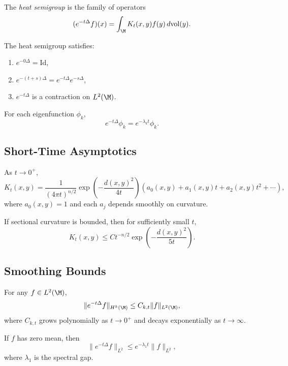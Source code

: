 \begin{definition}
The \emph{heat semigroup} is the family of operators
\[
(e^{-t\Delta} f)(x)
= \int_\M K_t(x,y) f(y)\, d\mathrm{vol}(y).
\]
\end{definition}

\begin{theorem}
The heat semigroup satisfies:
\begin{enumerate}
    \item $e^{-0\Delta} = \mathrm{Id}$,
    \item $e^{-(t+s)\Delta} = e^{-t\Delta} e^{-s\Delta}$,
    \item $e^{-t\Delta}$ is a contraction on $L^2(\M)$.
\end{enumerate}
\end{theorem}

\begin{lemma}
For each eigenfunction $\phi_k$,
\[
e^{-t\Delta} \phi_k = e^{-\lambda_k t} \phi_k.
\]
\end{lemma}

\subsection{Short-Time Asymptotics}

\begin{theorem}
As $t \to 0^+$,
\[
K_t(x,y)
= \frac{1}{(4\pi t)^{n/2}}
\exp\!\left( -\frac{d(x,y)^2}{4t} \right)
\left( a_0(x,y) + a_1(x,y)t + a_2(x,y)t^2 + \cdots \right),
\]
where $a_0(x,y) = 1$ and each $a_j$ depends smoothly on curvature.
\end{theorem}

\begin{lemma}
If sectional curvature is bounded, then for sufficiently small $t$,
\[
K_t(x,y)
\le C t^{-n/2} \exp\!\left( -\frac{d(x,y)^2}{5t} \right).
\]
\end{lemma}

\subsection{Smoothing Bounds}

\begin{theorem}
For any $f \in L^2(\M)$,
\[
\| e^{-t\Delta} f \|_{H^k(\M)}
\le C_{k,t} \|f\|_{L^2(\M)},
\]
where $C_{k,t}$ grows polynomially as $t \to 0^+$ and decays exponentially as $t \to \infty$.
\end{theorem}

\begin{lemma}
If $f$ has zero mean, then
\[
\| e^{-t\Delta} f \|_{L^2}
\le e^{-\lambda_1 t} \|f\|_{L^2},
\]
where $\lambda_1$ is the spectral gap.
\end{lemma}

